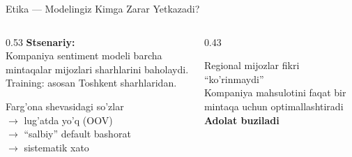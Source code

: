 \documentclass[aspectratio=169,11pt]{beamer}
\begin{document}
\begin{frame}{Etika --- Modelingiz Kimga Zarar Yetkazadi?}
  \begin{columns}[T]
    \begin{column}{0.53\textwidth}
      \small
      \textbf{Stsenariy:}\\
      Kompaniya sentiment modeli
      barcha mintaqalar mijozlari
      sharhlarini baholaydi.\\[5pt]
      Training: asosan Toshkent sharhlaridan.\\[4pt]
      \begin{tcolorbox}[warnbox]
        \small
        Farg'ona shevasidagi so'zlar\\
        $\to$ lug'atda yo'q (OOV)\\
        $\to$ ``salbiy'' default bashorat\\
        $\to$ sistematik xato
      \end{tcolorbox}
    \end{column}
    \begin{column}{0.43\textwidth}
      \vspace{10pt}
      \begin{tcolorbox}[defbox,title=Agar hal qilinmasa]
        \small
        Regional mijozlar fikri
        ``ko'rinmaydi''\\[3pt]
        Kompaniya mahsulotini
        faqat bir mintaqa uchun
        optimallashtiradi\\[3pt]
        \textbf{Adolat buziladi}
      \end{tcolorbox}
    \end{column}
  \end{columns}
\end{frame}
\end{document}
